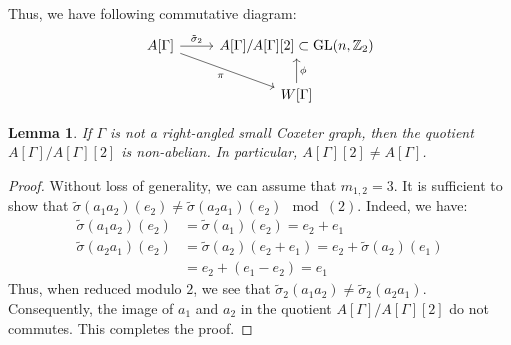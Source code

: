 \documentclass[12pt]{amsart}
\newtheorem{lemma}[equation]{Lemma}
\theoremstyle{definition}
\numberwithin{equation}{section}
\newcommand{\GL}{\mathrm{GL}}
\begin{document}
Thus,  we have following commutative diagram:
\begin{equation}\label{phieqn}
\begin{tikzcd}
	{A[\Gamma]} & {{A[\Gamma]/A[\Gamma][2]\subset \GL(n,\mathbb Z_2)}} \\
	{} & {W[\Gamma]}
	\arrow["{\tilde{\sigma}_2}", from=1-1, to=1-2]
	\arrow["\pi"', from=1-1, to=2-2]
	\arrow["\phi"', from=2-2, to=1-2]
\end{tikzcd}
\end{equation}
\begin{lemma}\label{lemma:nonabelian}
If $\Gamma$ is not a right-angled small Coxeter graph, then the quotient $A[\Gamma]/A[\Gamma][2]$ is non-abelian. In particular, $A[\Gamma][2] \neq A[\Gamma]$.
\end{lemma}
\begin{proof}
Without loss of generality, we can assume that $m_{1,2}=3$. It is sufficient to show that $\tilde{\sigma}(a_1a_2)(e_2)\neq \tilde{\sigma}(a_2a_1)(e_2) \mod(2)$. Indeed, we have: 
\begin{align*}
\tilde{\sigma}(a_1a_2)(e_2)&=\tilde{\sigma}(a_1)(e_2)=e_2 + e_1\\
\tilde{\sigma}(a_2a_1)(e_2)&=\tilde{\sigma}(a_2)(e_2+e_1)=e_2+\tilde{\sigma}(a_2)(e_1)\\
&=e_2 + (e_1 - e_2) =e_1
\end{align*}
Thus, when reduced modulo $2$, we see that $\tilde{\sigma}_2(a_1a_2)\neq \tilde{\sigma}_2(a_2a_1)$. Consequently, the image of $a_1$ and $a_2$ in the quotient $A[\Gamma]/A[\Gamma][2]$ do not commutes. This completes the proof.
\end{proof}
\end{document}
